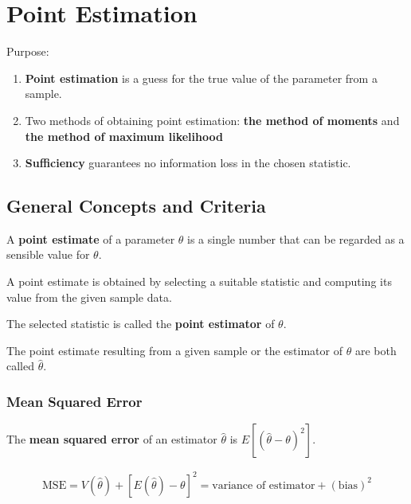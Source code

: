 \chapter{Point Estimation}

Purpose:

\begin{enumerate}
    \item \textbf{Point estimation} is a guess for the true value of the parameter from a sample.
    \item Two methods of obtaining point estimation: \textbf{the method of moments} and \textbf{the method of maximum likelihood}
    \item \textbf{Sufficiency} guarantees no information loss in the chosen statistic.
\end{enumerate}

\section{General Concepts and Criteria}

\begin{definition}
    A \textbf{point estimate} of a parameter $\theta$ is a single number that can be regarded as a sensible value for $\theta$. 

    A point estimate is obtained by selecting a suitable statistic and computing its value from the given sample data. 

    The selected statistic is called the \textbf{point estimator} of $\theta$.

    The point estimate resulting from a given sample or the estimator of $\theta$ are both called $\hat{\theta}$.
\end{definition}

\subsection{Mean Squared Error}

\begin{definition}
    The \textbf{mean squared error} of an estimator $\hat{\theta}$ is $E[(\hat{\theta} - \theta)^2]$.

    \begin{align*}
        \text{MSE} = V(\hat{\theta}) + [E(\hat{\theta}) - \theta]^2 = \text{variance of estimator} + (\text{bias})^2 \\
    \end{align*}
\end{definition}

